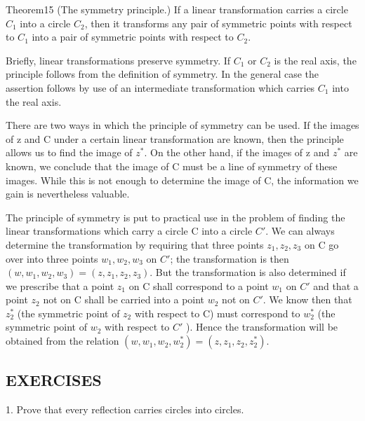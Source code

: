 \begingroup\renewcommand{\thefootnote}{}\endgroup

\begin{originalstatement}{Theorem}{15}\label{thm:3.15}
(The symmetry principle.) If a linear transformation carries a circle $C_{1}$ into a circle $C_{2}$, then it transforms any pair of symmetric points with respect to $C_{1}$ into a pair of symmetric points with respect to $C_{2}$.
\end{originalstatement}
Briefly, linear transformations preserve symmetry. If $C_{1}$ or $C_{2}$ is the real axis, the principle follows from the definition of symmetry. In the general case the assertion follows by use of an intermediate transformation which carries $C_{1}$ into the real axis.

There are two ways in which the principle of symmetry can be used. If the images of z and C under a certain linear transformation are known, then the principle allows us to find the image of $z^{*}$. On the other hand, if the images of z and $z^{*}$ are known, we conclude that the image of C must be a line of symmetry of these images. While this is not enough to determine the image of C, the information we gain is nevertheless valuable.

The principle of symmetry is put to practical use in the problem of finding the linear transformations which carry a circle C into a circle $C'$. We can always determine the transformation by requiring that three points $z_{1}, z_{2}, z_{3}$ on C go over into three points $w_{1}, w_{2}, w_{3}$ on $C'$; the transformation is then $(w, w_{1}, w_{2}, w_{3}) = (z, z_{1}, z_{2}, z_{3})$. But the transformation is also determined if we prescribe that a point $z_{1}$ on C shall correspond to a point $w_{1}$ on $C'$ and that a point $z_{2}$ not on C shall be carried into a point $w_{2}$ not on $C'$. We know then that $z_{2}^{*}$ (the symmetric point of $z_{2}$ with respect to C) must correspond to $w_{2}^{*}$ (the symmetric point of $w_{2}$ with respect to $C'$ ). Hence the transformation will be obtained from the relation $(w, w_{1}, w_{2}, w_{2}^{*}) = (z, z_{1}, z_{2}, z_{2}^{*})$.

\subsection*{EXERCISES}
1. Prove that every reflection carries circles into circles.


